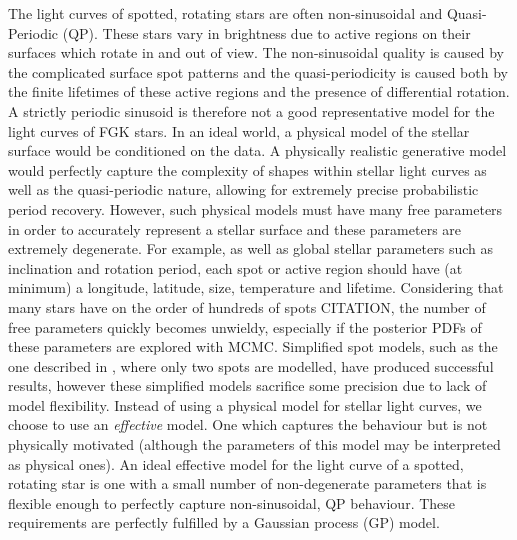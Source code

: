 
The light curves of spotted, rotating stars are often non-sinusoidal and
Quasi-Periodic (QP).
These stars vary in brightness due to active regions on their surfaces which
rotate in and out of view.
The non-sinusoidal quality is caused by the complicated surface spot patterns
and the quasi-periodicity is caused both by the finite lifetimes of these
active regions and the presence of differential rotation.
A strictly periodic sinusoid is therefore not a good representative
model for the light curves of FGK stars.
In an ideal world, a physical model of the stellar surface would be
conditioned on the data.
A physically realistic generative model would perfectly capture the
complexity of shapes within stellar light curves as well as the
quasi-periodic nature, allowing for extremely precise probabilistic period
recovery.
However, such physical models must have many free parameters in order to
accurately represent a stellar surface and these parameters are extremely
degenerate.
For example, as well as global stellar parameters such as inclination and
rotation period, each spot or active region should have (at minimum) a
longitude, latitude, size, temperature and lifetime.
Considering that many stars have on the order of hundreds of spots CITATION,
the number of free parameters quickly becomes unwieldy, especially if the
posterior PDFs of these parameters are explored with MCMC.
Simplified spot models, such as the one described in \citet{lanza}, where
only two spots are modelled, have produced successful results, however these
simplified models sacrifice some precision due to lack of model flexibility.
Instead of using a physical model for stellar light curves, we choose to use
an {\it effective} model.
One which captures the behaviour but is not physically motivated (although
the parameters of this model may be interpreted as physical ones).
An ideal effective model for the light curve of a spotted, rotating star is
one with a small number of non-degenerate parameters that is flexible enough
to perfectly capture non-sinusoidal, QP behaviour.
These requirements are perfectly fulfilled by a Gaussian process (GP) model.

